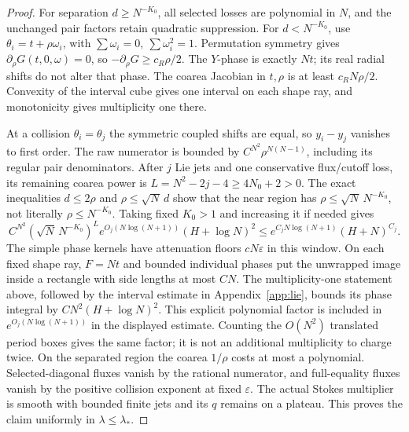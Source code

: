 \documentclass[11pt]{article}
\numberwithin{equation}{section}
\theoremstyle{definition}
\newcommand{\eps}{\varepsilon}
\begin{document}
\begin{proof}
For separation \(d\ge N^{-K_0}\), all selected losses are polynomial
in \(N\), and the unchanged pair factors retain quadratic suppression.
For \(d<N^{-K_0}\), use \(\theta_i=t+\rho\omega_i\), with
\(\sum\omega_i=0,\ \sum\omega_i^2=1\).
Permutation symmetry gives \(\partial_\rho G(t,0,\omega)=0\),
so \(-\partial_\rho G\ge c_R\rho/2\).
The \(Y\)-phase is exactly \(Nt\); its real radial shifts do not
alter that phase. The coarea Jacobian in \(t,\rho\) is at least
\(c_RN\rho/2\). Convexity of the interval cube gives one interval
on each shape ray, and monotonicity gives multiplicity one there.

At a collision \(\theta_i=\theta_j\) the symmetric coupled shifts
are equal, so \(y_i-y_j\) vanishes to first order. The raw numerator
is bounded by \(C^{N^2}\rho^{N(N-1)}\), including its regular pair
denominators. After \(j\) Lie jets and one conservative flux/cutoff
loss, its remaining coarea power is
\(L=N^2-2j-4\ge4N_0+2>0\).
The exact inequalities \(d\le2\rho\) and \(\rho\le\sqrt N\,d\)
show that the near region
has \(\rho\le\sqrt N\,N^{-K_0}\), not literally \(\rho\le N^{-K_0}\).
Taking fixed \(K_0>1\) and increasing it if needed gives
\[
 C^{N^2}(\sqrt N\,N^{-K_0})^L
      e^{O_j(N\log(N+1))}(H+\log N)^2
 \le e^{C_jN\log(N+1)}(H+N)^{C_j}.
\]
The simple phase kernels have attenuation floors \(cN\eps\) in
this window. On each fixed shape ray, \(F=Nt\) and bounded individual
phases put the unwrapped image inside a rectangle with side lengths
at most \(CN\). The multiplicity-one statement above, followed by
the interval estimate in Appendix~\ref{app:lie}, bounds its phase
integral by \(CN^2(H+\log N)^2\). This explicit polynomial factor
is included in \(e^{O_j(N\log(N+1))}\) in the displayed estimate.
Counting the \(O(N^2)\) translated period boxes gives the same
factor; it is not an additional multiplicity to charge twice.
On the separated region the coarea \(1/\rho\) costs at most a
polynomial.
Selected-diagonal fluxes vanish by the rational numerator, and
full-equality fluxes vanish by the positive collision exponent at
fixed \(\eps\). The actual Stokes multiplier is smooth with bounded
finite jets and its \(q\) remains on a plateau. This proves the
claim uniformly in \(\lambda\le\lambda_*\).
\end{proof}
\end{document}
